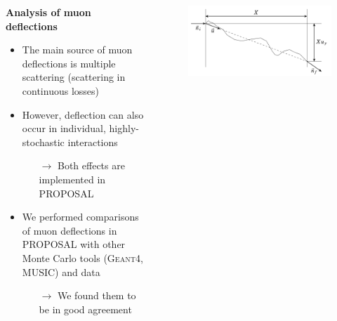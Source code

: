 \begin{frame}[c]
    \begin{columns}[onlytextwidth]
    \begin{column}{0.45\textwidth}
        \textbf{Analysis of muon deflections}
        \begin{itemize}
            \item The main source of muon deflections is multiple scattering (scattering in continuous losses)
            \item However, deflection can also occur in individual, highly-stochastic interactions
            \begin{itemize}
                \item[$\rightarrow$] Both effects are implemented in PROPOSAL
            \end{itemize}
            \item We performed comparisons of muon deflections in PROPOSAL with other Monte Carlo tools (\textsc{Geant4}, MUSIC) and data
            \begin{itemize}
                \item[$\rightarrow$] We found them to be in good agreement
            \end{itemize}
        \end{itemize}

    \end{column}
        \begin{column}{0.55\textwidth}

            \begin{figure}
              \includegraphics[width=0.8\linewidth, keepaspectratio]{plots/multiple_scattering_dunsch.png}
              \captionsetup{justification=centering}
            \end{figure}
        \vspace{3pt}
        \begin{figure}




\end{figure}
\end{column}
\end{columns}
\end{frame}
